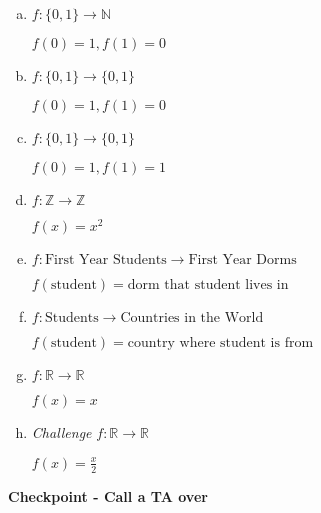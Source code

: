 \documentclass[12pt,letterpaper]{article}
\newcommand\N{\mathbb N}
\newcommand\Z{\mathbb Z}
\newcommand\R{\mathbb R}
\newif\ifsol
\newcommand{\solm}[1]{\ifsol \textit{(#1)} \fi}
\begin{document}
      \begin{enumerate}[a.]
        \item $f : \{0,1\} \rightarrow \N$

        $f(0) = 1, f(1) = 0$ 

	  \solm{Injective but not surjective.}

        \item $f : \{0,1\} \rightarrow \{0,1\}$

        $f(0) = 1, f(1) = 0$

		\solm{Injective and surjective. Therefore bijective.}

        \item $f : \{0,1\} \rightarrow \{0,1\}$

        $f(0) = 1, f(1) = 1$

		\solm{Not injective or surjective.}

        \item $f : \Z \rightarrow \Z$

        $f(x) = x^2$

		\solm{Not injective or surjective.}		

        \item $f : \text{First Year Students} \rightarrow \text{First Year Dorms}$

        $f(\text{student}) = \text{dorm that student lives in}$

		\solm{Not injective. Surjective.}		

        \item $f : \text{Students} \rightarrow \text{Countries in the World}$

        $f(\text{student}) = \text{country where student is from}$

		\solm{Not injective or surjective.}		

        \item $f : \R \rightarrow \R$

        $f(x) = x$

		\solm{Injective and surjective. Therefore bijective.}		

        \item \textit{Challenge} $f : \R \rightarrow \R$

        $f(x) = \frac{x}{2}$

		\solm{Injective and surjective. Therefore bijective.}		

      \end{enumerate}

	\textbf{Checkpoint - Call a TA over}
\end{document}
